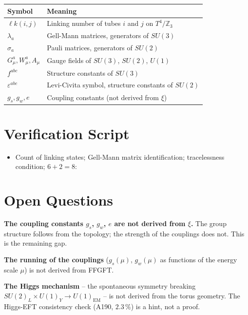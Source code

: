 \begin{center}
\renewcommand{\arraystretch}{1.3}
{\small\begin{tabular}{lp{9cm}}
\toprule
Symbol & Meaning \\
\midrule
$\ell k(i,j)$ & Linking number of tubes $i$ and $j$ on $T^4/\mathbb{Z}_3$ \\
$\lambda_a$ & Gell-Mann matrices, generators of $SU(3)$ \\
$\sigma_a$ & Pauli matrices, generators of $SU(2)$ \\
$G_\mu^a, W_\mu^a, A_\mu$ & Gauge fields of $SU(3)$, $SU(2)$, $U(1)$ \\
$f^{abc}$ & Structure constants of $SU(3)$ \\
$\varepsilon^{abc}$ & Levi-Civita symbol, structure constants of $SU(2)$ \\
$g_s, g_w, e$ & Coupling constants (not derived from $\xi$) \\
\bottomrule
\end{tabular}}
\renewcommand{\arraystretch}{1.0}
\end{center}

\section{Verification Script}

\begin{itemize}[leftmargin=2em,itemsep=2pt,topsep=2pt]
  \item Count of linking states; Gell-Mann matrix identification;
    tracelessness condition; $6+2=8$:
\end{itemize}

\section{Open Questions}

\textbf{The coupling constants $g_s$, $g_w$, $e$ are not derived from $\xi$.}
The group structure follows from the topology; the strength of the couplings
does not. This is the remaining gap.

\textbf{The running of the couplings} ($g_s(\mu)$, $g_w(\mu)$ as functions of
the energy scale $\mu$) is not derived from FFGFT.

\textbf{The Higgs mechanism} -- the spontaneous symmetry breaking
$SU(2)_L\times U(1)_Y\to U(1)_\text{EM}$ -- is not derived from the
torus geometry. The Higgs-EFT consistency check (A190, $2{.}3\,\%$) is a
hint, not a proof.

